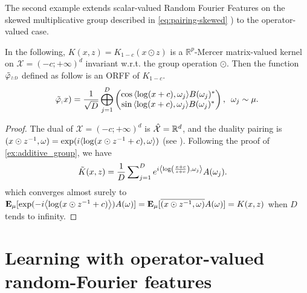 The second example extends scalar-valued Random Fourier Features on the skewed multiplicative group described in \cref{eq:pairing-skewed} \cite{li2010random}) to the operator-valued case.
\begin{example}
In the following, $K(x,z)=K_{1-c}(x\odot z)$ is a $\mathbb{R}^p$-Mercer matrix-valued kernel on $\mathcal{X}=(-c;+\infty)^d$ invariant w.r.t. the group operation $\odot$. Then the function $\tildePhi{1:D}$ defined as follow is an \acl{ORFF} of $K_{1-c}$.
\begin{equation*}
\begin{aligned}
\tildePhi(x)=\frac{1}{\sqrt{D}}\Vect_{j=1}^D\begin{pmatrix}\cos{\inner{\log(x+c),\omega_j}}B(\omega_j)^* \\ \sin{\inner{\log(x+c),\omega_j}}B(\omega_j)^*\end{pmatrix}, \enskip \omega_j \sim \mu.
\end{aligned}
\end{equation*}
\end{example}
\begin{proof}
The dual of $\mathcal{X}=(-c;+\infty)^d$
is $\dual{\mathcal{X}}=\mathbb{R}^d$, and the duality pairing is $\pairing{x \odot \myinv{z},\omega}=\exp(i\inner{\log(x\odot z^{-1}+c), \omega})$ (see \citet{Li2010}). Following the proof of \cref{ex:additive_group}, we have
\begin{equation*}
\begin{aligned}
\tilde{K}(x,z)&= \frac{1}{D} \sum\nolimits_{j=1}^D e^{i\inner*{\log\left(\frac{x+c}{z+c}\right), \omega_j}}A(\omega_j).
\end{aligned}
\end{equation*}
which converges almost surely to $\expectation_{\mu}[\exp(-i\inner*{\log(x\odot z^{-1}+c)})A(\omega) ]=\expectation_{\mu}[\conj{\pairing{x\odot z^{-1},\omega}}A(\omega)]=K(x, z)$ when $D$ tends to infinity.
\end{proof}

\section{Learning with operator-valued random-Fourier features}
\label{sec:learning_with_operator-valued_random-fourier_features}

